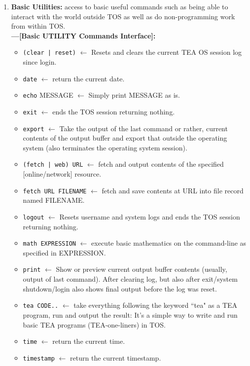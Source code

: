 \documentclass{article}
\begin{document}
\begin{enumerate}
\item {  \textbf{Basic Utilities:} access to basic useful commands such as being able to interact with the world outside TOS as well as do non-programming work from within TOS.\\
\textbf{---[Basic UTILITY Commands Interface]:}
\begin{itemize}
\item \texttt{(clear | reset)} $\leftarrow$ Resets and clears the current TEA OS session log since login.
\item \texttt{date} $\leftarrow$ return the current date.
\item \texttt{echo} MESSAGE $\leftarrow$ Simply print MESSAGE as is.
\item \texttt{exit} $\leftarrow$ ends the TOS session returning nothing.
\item \texttt{export} $\leftarrow$ Take the output of the last command or rather, current contents of the output buffer and export that outside the operating system (also terminates the operating system session).

\item \texttt{(fetch | web) URL} $\leftarrow$ fetch and output contents of the specified [online/network] resource.
\item \texttt{fetch URL FILENAME} $\leftarrow$ fetch and save contents at URL into file record named FILENAME.

\item \texttt{logout} $\leftarrow$ Resets username and system logs and ends the TOS session returning nothing.

\item \texttt{math EXPRESSION} $\leftarrow$ execute basic mathematics on the command-line as specified in EXPRESSION.

\item \texttt{print} $\leftarrow$ Show or preview current output buffer contents (usually, output of last command). After clearing log, but also after exit/system shutdown/login also shows final output before the log was reset.

\item \texttt{tea CODE..} $\leftarrow$ take everything following the keyword ``tea" as a TEA program, run and output the result: It's a simple way to write and run basic TEA programs (TEA-one-liners) in TOS.

\item \texttt{time} $\leftarrow$ return the current time.
\item \texttt{timestamp} $\leftarrow$ return the current timestamp.



\end{itemize}}
\end{enumerate}
\end{document}
